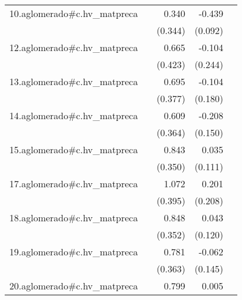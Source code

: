 {\begin{longtable}{l*{4}{D{.}{.}{-1}}}
\addlinespace
10.aglomerado#c.hv\_matpreca&                     &       0.340         &      -0.439\sym{***}&                     \\
            &                     &     (0.344)         &     (0.092)         &                     \\
\addlinespace
12.aglomerado#c.hv\_matpreca&                     &       0.665         &      -0.104         &                     \\
            &                     &     (0.423)         &     (0.244)         &                     \\
\addlinespace
13.aglomerado#c.hv\_matpreca&                     &       0.695         &      -0.104         &                     \\
            &                     &     (0.377)         &     (0.180)         &                     \\
\addlinespace
14.aglomerado#c.hv\_matpreca&                     &       0.609         &      -0.208         &                     \\
            &                     &     (0.364)         &     (0.150)         &                     \\
\addlinespace
15.aglomerado#c.hv\_matpreca&                     &       0.843\sym{*}  &       0.035         &                     \\
            &                     &     (0.350)         &     (0.111)         &                     \\
\addlinespace
17.aglomerado#c.hv\_matpreca&                     &       1.072\sym{**} &       0.201         &                     \\
            &                     &     (0.395)         &     (0.208)         &                     \\
\addlinespace
18.aglomerado#c.hv\_matpreca&                     &       0.848\sym{*}  &       0.043         &                     \\
            &                     &     (0.352)         &     (0.120)         &                     \\
\addlinespace
19.aglomerado#c.hv\_matpreca&                     &       0.781\sym{*}  &      -0.062         &                     \\
            &                     &     (0.363)         &     (0.145)         &                     \\
\addlinespace
20.aglomerado#c.hv\_matpreca&                     &       0.799\sym{*}  &       0.005         &                     \\

\end{longtable}}
